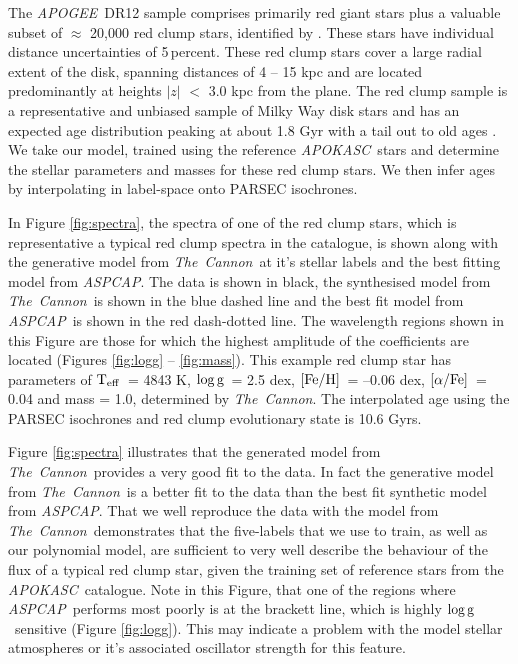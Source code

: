 \documentclass[12pt, preprint]{aastex}
\newcommand{\project}[1]{\textsl{#1}}
\newcommand{\tc}{\project{The~Cannon}}
\newcommand{\apogee}{\project{APOGEE}}
\newcommand{\apokasc}{\project{APOKASC}}
\newcommand{\aspcap}{\project{ASPCAP}}
\newcommand{\teff}{\mbox{$\rm T_{eff}$}}
\newcommand{\feh}{\mbox{$\rm [Fe/H]$}}
\newcommand{\alphafe}{\mbox{$\rm [\alpha/Fe]$}}
\newcommand{\logg}{\mbox{$\rm \log g$}}
\begin{document}
The \apogee\ DR12 sample comprises primarily red giant stars plus a valuable subset of  $\approx$ 20,000 red clump stars, identified by \citet{Bovy2014}.  These stars have individual distance uncertainties of 5\,percent. These red clump stars cover a large radial extent of the disk, spanning distances of 4 -- 15 kpc and are located predominantly at heights $|z|$ $<$ 3.0 kpc from the plane. The red clump sample is a representative and unbiased sample of Milky Way disk stars and has an expected age distribution peaking at about 1.8 Gyr with a tail out to old ages \citep[see Figure 15 of][]{Bovy2014}. We take our model, trained using the reference \apokasc\ stars and determine the stellar parameters and masses for these red clump stars. We then infer ages by interpolating in label-space onto PARSEC isochrones.

In Figure \ref{fig:spectra}, the spectra of one of the red clump stars, which is representative a typical red clump spectra in the catalogue, is shown along with the generative model from \tc\ at it's stellar labels and the best fitting model from \aspcap. The data is shown in black, the synthesised model from \tc\ is shown in the blue dashed line and the best fit model from \aspcap\ is shown in the red dash-dotted line. The wavelength regions shown in this Figure are those for which the highest amplitude of the coefficients are located (Figures \ref{fig:logg} -- \ref{fig:mass}).  This example red clump star has parameters of \teff\ = 4843 K, \logg\ = 2.5 dex, \feh\ = --0.06 dex, \alphafe\ = 0.04 and mass = 1.0, determined by \tc. The interpolated age using the PARSEC isochrones and red clump evolutionary state is 10.6 Gyrs. 

Figure \ref{fig:spectra} illustrates that the generated model from \tc\ provides a very good fit to the data. In fact the generative model from \tc\ is a better fit to the data than the best fit synthetic model from \aspcap. That we well reproduce the data with the model from \tc\ demonstrates that the five-labels that we use to train, as well as our polynomial model, are sufficient to very well describe the behaviour of the flux of a typical red clump star, given the training set of reference stars from the \apokasc\ catalogue. Note in this Figure, that one of the regions where \aspcap\ performs most poorly is  at the brackett line, which is highly \logg\ sensitive (Figure \ref{fig:logg}). This may indicate a problem with the model stellar atmospheres or it's associated oscillator strength for this feature. 
\end{document}
